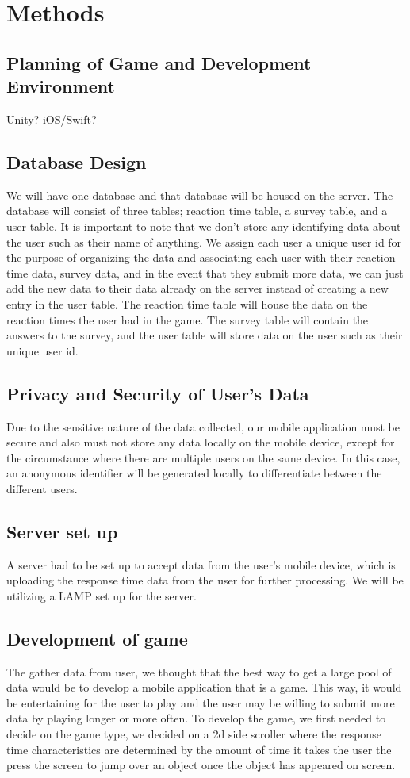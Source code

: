 \documentclass[a4wide]{article}
\begin{document}
\section{Methods}
\subsection{Planning of Game and Development Environment}
Unity? iOS/Swift?
\subsection{Database Design}
\- We will have one database and that database will be housed on the server. The database will consist of three tables; reaction time table, a survey table, and a user table. It is important to note that we don't store any identifying data about the user such as their name of anything. We assign each user a unique user id for the purpose of organizing the data and associating each user with their reaction time data, survey data, and in the event that they submit more data, we can just add the new data to their data already on the server instead of creating a new entry in the user table. The reaction time table will house the data on the reaction times the user had in the game. The survey table will contain the answers to the survey, and the user table will store data on the user such as their unique user id.
\subsection{Privacy and Security of User's Data}
\- Due to the sensitive nature of the data collected, our mobile application must be secure and also must not store any data locally on the mobile device, except for the circumstance where there are multiple users on the same device. In this case, an anonymous identifier will be generated locally to differentiate between the different users. 
\subsection{Server set up}
\- A server had to be set up to accept data from the user's mobile device, which is uploading the response time data from the user for further processing. We will be utilizing a LAMP set up for the server.
\subsection{Development of game}
\- The gather data from user, we thought that the best way to get a large pool of data would be to develop a mobile application that is a game. This way, it would be entertaining for the user to play and the user may be willing to submit more data by playing longer or more often. To develop the game, we first needed to decide on the game type, we decided on a 2d side scroller where the response time characteristics are determined by the amount of time it takes the user the press the screen to jump over an object once the object has appeared on screen. 
\end{document}
